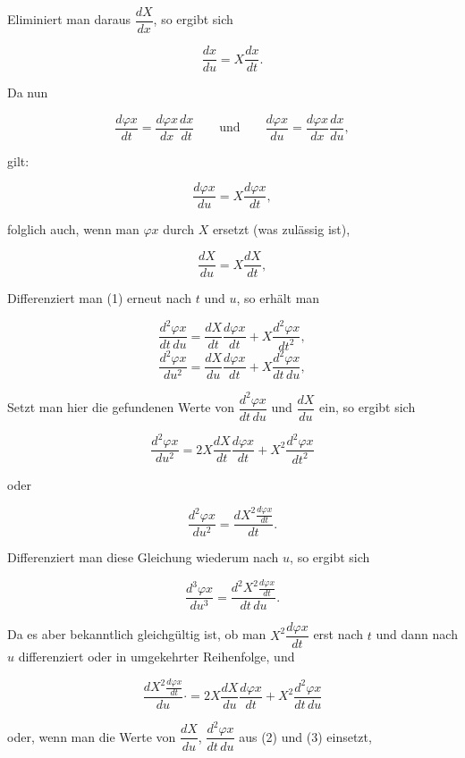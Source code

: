 
\noindent
Eliminiert man daraus $\dfrac{dX}{dx}$, so ergibt sich

\[
\frac{dx}{du} = X\frac{dx}{dt}.
\]

\noindent
Da nun

\[
\frac{d\varphi x}{dt} = \frac{d\varphi x}{dx}\frac{dx}{dt} \qquad \text{und} \qquad
\frac{d\varphi x}{du} = \frac{d\varphi x}{dx}\frac{dx}{du},
\]

\noindent
gilt:

\begin{equation}\tag{1}
\frac{d\varphi x}{du} = X\frac{d\varphi x}{dt},
\end{equation}

\noindent
folglich auch, wenn man $\varphi x$ durch $X$ ersetzt (was zulässig ist),

\begin{equation}\tag{2}
\frac{dX}{du} = X\frac{dX}{dt},
\end{equation}

\noindent
Differenziert man (1) erneut nach $t$ und $u$, so erhält man

\begin{equation}\tag{3}
\frac{d^2\varphi x}{dt\,du}=\frac{dX}{dt}\frac{d\varphi x}{dt}+X\frac{d^2\varphi x}{dt^2},
\end{equation}
\[
\frac{d^2\varphi x}{du^2}=\frac{dX}{du}\frac{d\varphi x}{dt}+X\frac{d^2\varphi x}{dt\,du},
\]

\noindent
Setzt man hier die gefundenen Werte von $\dfrac{d^2\varphi x}{dt\,du}$ und $\dfrac{dX}{du}$
ein, so ergibt sich

\[
\frac{d^2\varphi x}{du^2} = 2X\frac{dX}{dt}\frac{d\varphi x}{dt} + X^2\frac{d^2\varphi x}{dt^2}
\]

\noindent
oder

\begin{equation}\tag{4}
\frac{d^2\varphi x}{du^2} = \frac{dX^2 \frac{d\varphi x}{dt}}{dt}.
\end{equation}

\noindent
Differenziert man diese Gleichung wiederum nach $u$, so ergibt sich

\[
\frac{d^3\varphi x}{du^3} = \frac{d^2X^2 \frac{d\varphi x}{dt}}{dt\,du}.
\]

\noindent\hspace*{\parindent}Da es aber bekanntlich gleichgültig ist, ob man $X^2\dfrac{d\varphi x}{dt}$ erst nach
$t$ und dann nach $u$ differenziert oder in umgekehrter Reihenfolge, und

\[
\frac{dX^2 \frac{d\varphi x}{dt}}{du}\mathord{\cdot} = 2X\frac{dX}{du}\frac{d\varphi x}{dt} + X^2\frac{d^2\varphi x}{dt\,du}
\]

\noindent
oder, wenn man die Werte von $\dfrac{dX}{du}$, $\dfrac{d^2\varphi x}{dt\,du}$ aus
(2) und (3) einsetzt,
